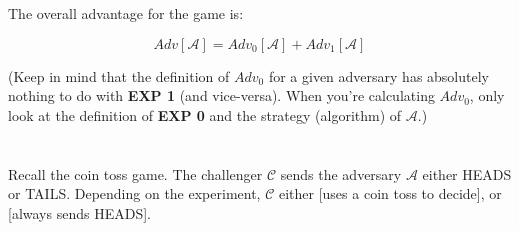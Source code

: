 \documentclass[12pt]{article}
\begin{document}
The overall advantage for the game is:

$$Adv[\mathcal{A}] = Adv_0[\mathcal{A}] + Adv_1[\mathcal{A}]$$

\vspace{1em}

(Keep in mind that the definition of $Adv_0$ for a given adversary has absolutely nothing to do with {\bf EXP 1} (and vice-versa). When you're calculating $Adv_0$, only look at the definition of {\bf EXP 0} and the strategy (algorithm) of $\mathcal{A}$.)

\newpage

\section{}

\subsection{}


Recall the coin toss game. The challenger $\mathcal{C}$ sends the adversary $\mathcal{A}$ either HEADS or TAILS. Depending on the experiment, $\mathcal{C}$ either [uses a coin toss to decide], or [always sends HEADS].\\



\begin{figure}
\hfill
{}
\hfill
{}
\hfill
\end{figure}
\end{document}
